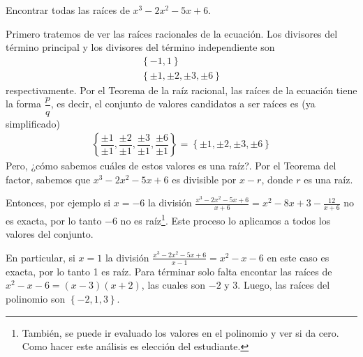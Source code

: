 \begin{example}
    Encontrar todas las raíces de $x^3 - 2x^2 - 5x + 6$.
\end{example}
\begin{solution}
    Primero tratemos de ver las raíces racionales de la ecuación.
    Los divisores del término principal y los divisores del término independiente son
    \begin{gather*}
        \left\{ -1, 1 \right\}\\
        \left\{ \pm 1, \pm 2, \pm 3, \pm6 \right\}
    \end{gather*}
    respectivamente.
    Por el Teorema de la raíz racional, las raíces de la ecuación tiene la forma $\dfrac{p}{q}$, es decir, el conjunto de valores candidatos a ser raíces es (ya simplificado)
    \begin{gather*}
        \left\{ \dfrac{\pm 1}{\pm 1}, \dfrac{\pm 2}{\pm 1}, \dfrac{\pm 3}{\pm 1}, \dfrac{\pm 6}{\pm 1} \right\} =
        \left\{ \pm 1, \pm 2, \pm 3, \pm 6 \right\}
    \end{gather*}
    Pero, ¿cómo sabemos cuáles de estos valores es una raíz?.
    Por el Teorema del factor, sabemos que $x^3 - 2x^2 - 5x + 6$ es divisible por $x - r$, donde $r$ es una raíz.

    Entonces, por ejemplo si $x = -6$ la división $\frac{x^3 - 2x^2 - 5x + 6}{x + 6} = x^2 - 8x + 3 - \frac{12}{x + 6}$ no es exacta, por lo tanto $-6$ no es raíz\footnote
    {También, se puede ir evaluado los valores en el polinomio y ver si da cero. Como hacer este análisis es elección del estudiante.}.
    Este proceso lo aplicamos a todos los valores del conjunto.

    En particular, si $x = 1$ la división $\frac{x^3 - 2x^2 - 5x + 6}{x - 1} = x^2 - x - 6$ en este caso es exacta, por lo tanto 1 es raíz.
    Para términar solo falta encontar las raíces de $x^2 - x - 6 = (x - 3)(x + 2)$, las cuales son $-2$ y 3.
    Luego, las raíces del polinomio son $\left\{ -2, 1, 3 \right\}$.
\end{solution}

